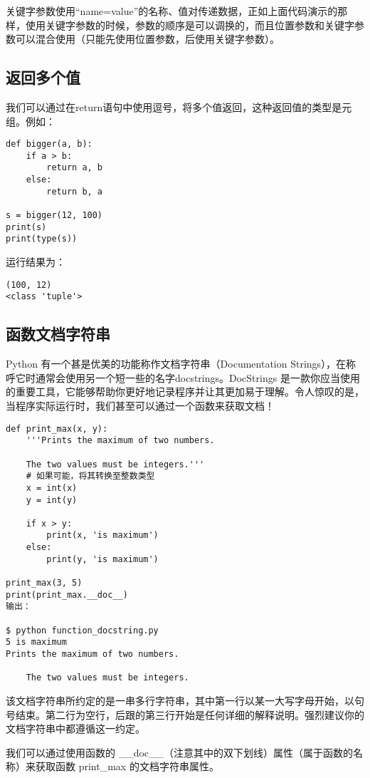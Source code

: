 关键字参数使用“name=value”的名称、值对传递数据，正如上面代码演示的那样，使用关键字参数的时候，参数的顺序是可以调换的，而且位置参数和关键字参数可以混合使用（只能先使用位置参数，后使用关键字参数）。

\subsection{返回多个值}
我们可以通过在return语句中使用逗号，将多个值返回，这种返回值的类型是元组。例如：

\begin{lstlisting}
def bigger(a, b):
    if a > b:
        return a, b
    else:
        return b, a

s = bigger(12, 100)
print(s)
print(type(s))
\end{lstlisting}

运行结果为：

\begin{lstlisting}
(100, 12)
<class 'tuple'>
\end{lstlisting}
\subsection{函数文档字符串} %
\label{sub:函数文档字符串}
Python 有一个甚是优美的功能称作文档字符串（Documentation Strings），在称呼它时通常会使用另一个短一些的名字docstrings。DocStrings 是一款你应当使用的重要工具，它能够帮助你更好地记录程序并让其更加易于理解。令人惊叹的是，当程序实际运行时，我们甚至可以通过一个函数来获取文档！

\begin{lstlisting}
def print_max(x, y):
    '''Prints the maximum of two numbers.

    The two values must be integers.'''
    # 如果可能，将其转换至整数类型
    x = int(x)
    y = int(y)

    if x > y:
        print(x, 'is maximum')
    else:
        print(y, 'is maximum')

print_max(3, 5)
print(print_max.__doc__)
输出：

$ python function_docstring.py
5 is maximum
Prints the maximum of two numbers.

    The two values must be integers.
\end{lstlisting}

该文档字符串所约定的是一串多行字符串，其中第一行以某一大写字母开始，以句号结束。第二行为空行，后跟的第三行开始是任何详细的解释说明。强烈建议你的文档字符串中都遵循这一约定。

我们可以通过使用函数的 \_\_doc\_\_（注意其中的双下划线）属性（属于函数的名称）来获取函数 print\_max 的文档字符串属性。
